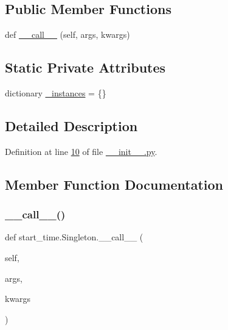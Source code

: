 \subsection*{Public Member Functions}
\begin{DoxyCompactItemize}
\item 
def \hyperlink{classstart__time_1_1_singleton_af0e193a3b8d4b62db86957e47c60e16f}{\+\_\+\+\_\+call\+\_\+\+\_\+} (self, args, kwargs)
\end{DoxyCompactItemize}
\subsection*{Static Private Attributes}
\begin{DoxyCompactItemize}
\item 
dictionary \hyperlink{classstart__time_1_1_singleton_a541fb2b583fdf801b3c77804fe9900b1}{\+\_\+instances} = \{\}
\end{DoxyCompactItemize}


\subsection{Detailed Description}


Definition at line \hyperlink{start__time_2____init_____8py_source_l00010}{10} of file \hyperlink{start__time_2____init_____8py_source}{\+\_\+\+\_\+init\+\_\+\+\_\+.\+py}.



\subsection{Member Function Documentation}
\mbox{\label{classstart__time_1_1_singleton_af0e193a3b8d4b62db86957e47c60e16f}} 
\subsubsection{\texorpdfstring{\+\_\+\+\_\+call\+\_\+\+\_\+()}{\_\_call\_\_()}}
{\footnotesize\ttfamily def start\+\_\+time.\+Singleton.\+\_\+\+\_\+call\+\_\+\+\_\+ (\begin{DoxyParamCaption}\item[{}]{self,  }\item[{}]{args,  }\item[{}]{kwargs }\end{DoxyParamCaption})}



